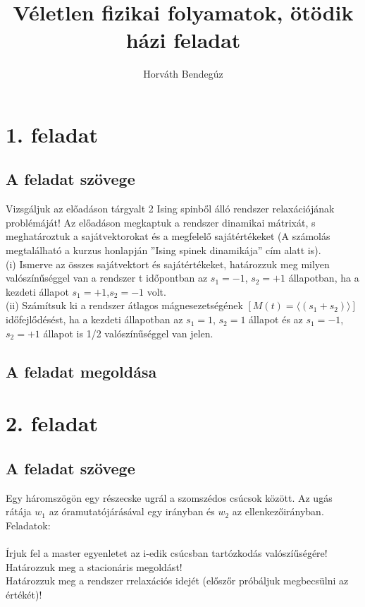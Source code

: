 \documentclass[12pt]{article}
\title{Véletlen fizikai folyamatok, ötödik házi feladat}
\author{Horváth Bendegúz}
\begin{document}
\maketitle
\section*{1. feladat}
\subsection*{A feladat szövege}
Vizsgáljuk az előadáson tárgyalt 2 Ising spinből álló rendszer relaxációjának problémáját! Az előadáson megkaptuk a rendszer dinamikai mátrixát, s meghatároztuk a sajátvektorokat és a megfelelő sajátértékeket (A számolás megtalálható a kurzus honlapján ”Ising spinek dinamikája” cím alatt is).\\
(i) Ismerve az összes sajátvektort és sajátértékeket, határozzuk meg milyen valószínűséggel van a rendszer t időpontban az $s_1 = {-1}$, $s_2 = +1$ állapotban, ha a kezdeti állapot $s_1 = +1$,$s_2 =-1$ volt.\\
(ii) Számítsuk ki a rendszer átlagos mágnesezetségének $[M(t) = \langle(s_1+s_2)\rangle] $időfejlődésést, ha a kezdeti állapotban az $s_1 = 1$, $ s_2 = 1$ állapot és az $s_1 = -1$, $s_2 = +1$ állapot is 1/2 valószínűséggel van jelen.
\subsection*{A feladat megoldása}

\newpage
\section*{2. feladat}
\subsection*{A feladat szövege}
Egy háromszögön egy részecske ugrál a szomszédos csúcsok között. Az ugás rátája $w_1$
az óramutatójárásával egy irányban és $w_2$ az ellenkezőirányban. Feladatok:\\\\
Írjuk fel a master egyenletet az i-edik csúcsban tartózkodás valószíűségére!\\ 
Határozzuk meg a stacionáris megoldást!\\
Határozzuk meg a rendszer rrelaxációs idejét  (előszőr próbáljuk megbecsülni az értékét)!
\end{document}
